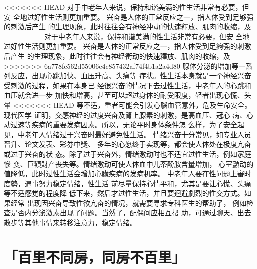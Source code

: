\documentclass[12pt,UTF8]{ctexbook}
\begin{document}
<<<<<<< HEAD
对于中老年人来说，保持和谐美满的性生活非常有必要，但安
全地过好性生活则更加重要。
兴奋是人体的正常反应之一，指人体受到足够强的刺激后产生
的生理现象，此时往往会有神经冲动的快速釋放、肌肉的收缩，及
=======
对于中老年人来说，保持和谐美满的性生活非常有必要，但安
全地过好性生活则更加重要。
兴奋是人体的正常反应之一，指人体受到足夠强的刺激后产生
的生理现象，此时往往会有神经衝动的快速釋放、肌肉的收缩，及
>>>>>>> 6a778fc562d55006c4c857432af74f4b1a2a4d80
腺体分泌的增加等一系列反应，出现心跳加快、血压升高、头痛等
症状。性生活本身就是一个神经兴奋受刺激的过程，如果在本身已
经很兴奋的情况下去过性生活，中老年人的心跳和血压就会进一步
加快和增高，甚至可以超过身体的耐受限度，轻者出现心慌、头暈
<<<<<<< HEAD
等不适，重者可能会引发心腦血管意外，危及生命安全。现代医学
证明，交感神经的过度兴奋及腎上腺素的刺激，是高血压、冠心
病、心动过速等疾病的重要发病因素。所以，无论平时身体条件怎
么样，为了安全起见，中老年人情绪过于兴奋时最好避免性生活。
情绪兴奋十分常见，如专业人员晉升、论文发表、彩券中獎、
多年的心愿终于实现等，都会使人体处在极度亢奋或过于兴奋的状
态。除了过于兴奋外，情绪激动时也不适宜过性生活，例如家庭慘
变、巨額財产丧失等。情绪激动可使人体血中儿茶酚胺含量增加，
心室顫动的值降低，此时过性生活会增加心臟疾病的发病机率。
中老年人要在性问题上審时度勢，遇事努力稳定情绪，性生活
前尽量保持心情平和，尤其是要让心慌、头痛等不适感觉的程度降
低下来，然后才过性生活，并且要迥避劇烈的性交方式。如果经常
出现因兴奋导致性欲亢奋的情况，就需要寻求专科医生的帮助了，
例如检查是否内分泌激素出现了问题。当然了，配偶间应相互帮
助，可通过聊天、出去散步等其他事情来转移注意力，稳定情绪。

\section{「百里不同房，同房不百里」}
\end{document}
